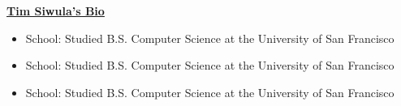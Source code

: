 \documentclass{article}
\newcommand{\MYhref}[3][blue]{\href{#2}{\color{#1}{#3}}}%
\begin{document}
\textbf{\href{}{\Large Tim Siwula's Bio}}


\begin{itemize}


\item School: Studied  B.S. Computer Science at the University of San Francisco
\item School: Studied  B.S. Computer Science at the University of San Francisco
\item School: Studied  B.S. Computer Science at the University of San Francisco



\end{itemize}
\end{document}
